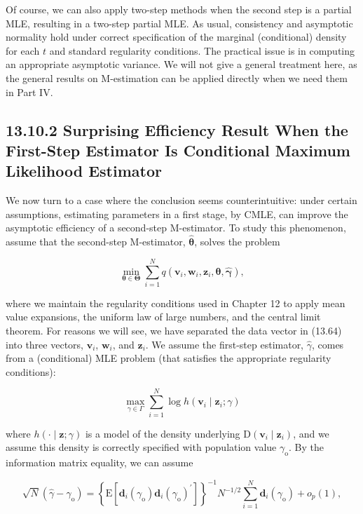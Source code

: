 \documentclass[10pt]{article}
\begin{document}
Of course, we can also apply two-step methods when the second step is a partial MLE, resulting in a two-step partial MLE. As usual, consistency and asymptotic normality hold under correct specification of the marginal (conditional) density for each $t$ and standard regularity conditions. The practical issue is in computing an appropriate asymptotic variance. We will not give a general treatment here, as the general results on M-estimation can be applied directly when we need them in Part IV.

\subsection*{13.10.2 Surprising Efficiency Result When the First-Step Estimator Is Conditional Maximum Likelihood Estimator}
We now turn to a case where the conclusion seems counterintuitive: under certain assumptions, estimating parameters in a first stage, by CMLE, can improve the asymptotic efficiency of a second-step M-estimator. To study this phenomenon, assume that the second-step M-estimator, $\hat{\boldsymbol{\theta}}$, solves the problem


\begin{equation*}
\min _{\boldsymbol{\theta} \in \boldsymbol{\Theta}} \sum_{i=1}^{N} q\left(\mathbf{v}_{i}, \mathbf{w}_{i}, \mathbf{z}_{i}, \boldsymbol{\theta}, \hat{\boldsymbol{\gamma}}\right), \tag{13.64}
\end{equation*}


where we maintain the regularity conditions used in Chapter 12 to apply mean value expansions, the uniform law of large numbers, and the central limit theorem. For reasons we will see, we have separated the data vector in (13.64) into three vectors, $\mathbf{v}_{i}$, $\mathbf{w}_{i}$, and $\mathbf{z}_{i}$. We assume the first-step estimator, $\hat{\gamma}$, comes from a (conditional) MLE problem (that satisfies the appropriate regularity conditions):

$$
\max _{\gamma \in \Gamma} \sum_{i=1}^{N} \log h\left(\mathbf{v}_{i} \mid \mathbf{z}_{i} ; \gamma\right)
$$

where $h(\cdot \mid \mathbf{z} ; \gamma)$ is a model of the density underlying $\mathrm{D}\left(\mathbf{v}_{i} \mid \mathbf{z}_{i}\right)$, and we assume this density is correctly specified with population value $\gamma_{\mathrm{o}}$. By the information matrix equality, we can assume


\begin{equation*}
\sqrt{N}\left(\hat{\gamma}-\gamma_{\mathrm{o}}\right)=\left\{\mathrm{E}\left[\mathbf{d}_{i}\left(\gamma_{\mathrm{o}}\right) \mathbf{d}_{i}\left(\gamma_{\mathrm{o}}\right)^{\prime}\right]\right\}^{-1} N^{-1 / 2} \sum_{i=1}^{N} \mathbf{d}_{i}\left(\gamma_{\mathrm{o}}\right)+o_{p}(1), \tag{13.65}
\end{equation*}
\end{document}
